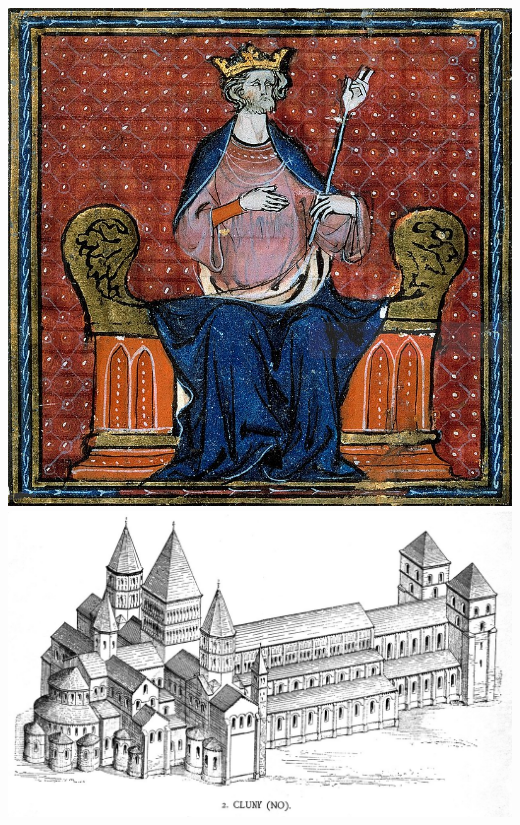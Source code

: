 \documentclass{article}
\begin{document}
\hfill
\noindent\begin{minipage}{0.3\textwidth}
    \includegraphics[width=\linewidth]{hugo_kapet.jpg}
    \includegraphics[width=\linewidth]{klaster_cluny.jpg}
\end{minipage}
\end{document}
